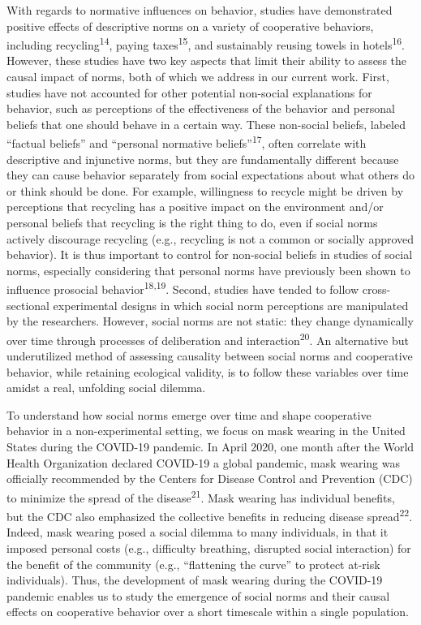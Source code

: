 \documentclass[
  man, donotrepeattitle,floatsintext]{apa6}
\begin{document}
With regards to normative influences on behavior, studies have demonstrated positive effects of descriptive norms on a variety of cooperative behaviors, including recycling\textsuperscript{14}, paying taxes\textsuperscript{15}, and sustainably reusing towels in hotels\textsuperscript{16}. However, these studies have two key aspects that limit their ability to assess the causal impact of norms, both of which we address in our current work. First, studies have not accounted for other potential non-social explanations for behavior, such as perceptions of the effectiveness of the behavior and personal beliefs that one should behave in a certain way. These non-social beliefs, labeled ``factual beliefs'' and ``personal normative beliefs''\textsuperscript{17}, often correlate with descriptive and injunctive norms, but they are fundamentally different because they can cause behavior separately from social expectations about what others do or think should be done. For example, willingness to recycle might be driven by perceptions that recycling has a positive impact on the environment and/or personal beliefs that recycling is the right thing to do, even if social norms actively discourage recycling (e.g., recycling is not a common or socially approved behavior). It is thus important to control for non-social beliefs in studies of social norms, especially considering that personal norms have previously been shown to influence prosocial behavior\textsuperscript{18,19}. Second, studies have tended to follow cross-sectional experimental designs in which social norm perceptions are manipulated by the researchers. However, social norms are not static: they change dynamically over time through processes of deliberation and interaction\textsuperscript{20}. An alternative but underutilized method of assessing causality between social norms and cooperative behavior, while retaining ecological validity, is to follow these variables over time amidst a real, unfolding social dilemma.

To understand how social norms emerge over time and shape cooperative behavior in a non-experimental setting, we focus on mask wearing in the United States during the COVID-19 pandemic. In April 2020, one month after the World Health Organization declared COVID-19 a global pandemic, mask wearing was officially recommended by the Centers for Disease Control and Prevention (CDC) to minimize the spread of the disease\textsuperscript{21}. Mask wearing has individual benefits, but the CDC also emphasized the collective benefits in reducing disease spread\textsuperscript{22}. Indeed, mask wearing posed a social dilemma to many individuals, in that it imposed personal costs (e.g., difficulty breathing, disrupted social interaction) for the benefit of the community (e.g., ``flattening the curve'' to protect at-risk individuals). Thus, the development of mask wearing during the COVID-19 pandemic enables us to study the emergence of social norms and their causal effects on cooperative behavior over a short timescale within a single population.
\end{document}
